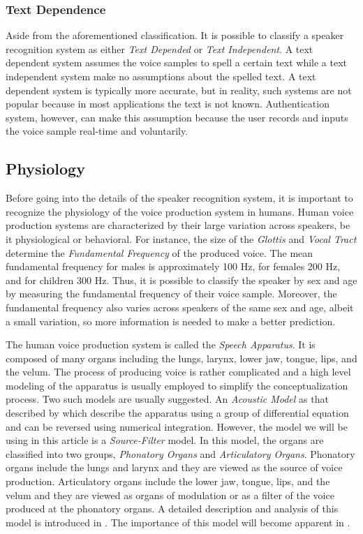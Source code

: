\documentclass[twocolumn]{article}
\begin{document}
\subsubsection{Text Dependence}

Aside from the aforementioned classification. It is possible to classify a
speaker recognition system as either \emph{Text Depended} or \emph{Text
Independent}. A text dependent system assumes the voice samples to spell a
certain text while a text independent system make no assumptions about the
spelled text. A text dependent system is typically more accurate, but in
reality, such systems are not popular because in most applications the text is
not known.  Authentication system, however, can make this assumption because
the user records and inputs the voice sample real-time and voluntarily.

\subsection{Physiology}

Before going into the details of the speaker recognition system, it is
important to recognize the physiology of the voice production system in humans.
Human voice production systems are characterized by their large variation
across speakers, be it physiological or behavioral. For instance, the size of
the \emph{Glottis} and \emph{Vocal Tract} determine the \emph{Fundamental
Frequency} of the produced voice. The mean fundamental frequency for males is
approximately 100 Hz, for females 200 Hz, and for children 300 Hz. Thus, it is
possible to classify the speaker by sex and age by measuring the fundamental
frequency of their voice sample. Moreover, the fundamental frequency also
varies across speakers of the same sex and age, albeit a small variation, so
more information is needed to make a better prediction.

The human voice production system is called the \emph{Speech Apparatus}. It is
composed of many organs including the lungs, larynx, lower jaw, tongue, lips,
and the velum. The process of producing voice is rather complicated and a high
level modeling of the apparatus is usually employed to simplify the
conceptualization process. Two such models are usually suggested. An
\emph{Acoustic Model} as that described by \autocite{Maeda1982} which describe
the apparatus using a group of differential equation and can be reversed using
numerical integration. However, the model we will be using in this article is a
\emph{Source-Filter} model. In this model, the organs are classified into two
groups, \emph{Phonatory Organs} and \emph{Articulatory Organs}. Phonatory
organs include the lungs and larynx and they are viewed as the source of voice
production. Articulatory organs include the lower jaw, tongue, lips, and the
velum and they are viewed as organs of modulation or as a filter of the voice
produced at the phonatory organs. A detailed description and analysis of this
model is introduced in \autocite{Degottex2010}. The importance of this model
will become apparent in .
\end{document}
